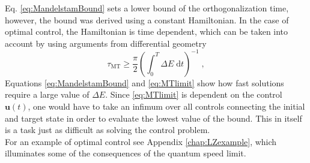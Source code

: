 Eq. \eqref{eq:MandelstamBound} sets a lower bound of the orthogonalization time, however, the bound was derived using a constant Hamiltonian. In the case of optimal control, the Hamiltonian is time dependent, which can be taken into account by using arguments from differential geometry \cite{Aharonov,beyondQSL}
\begin{equation}
	\tau_{\mathrm{MT}} \geq \frac{\pi}{2} \left( \int_{0}^{T} \Delta E \; \mathrm{d}t \right) ^{-1} \; , \label{eq:MTlimit}
\end{equation}
Equations \eqref{eq:MandelstamBound} and \eqref{eq:MTlimit} show how fast solutions require a large value of $\Delta E$. Since \ref{eq:MTlimit} is dependent on the control $\boldsymbol{u}(t)$, one would have to take an infimum over all controls connecting the initial and target state in order to evaluate the lowest value of the bound. This in itself is a task just as difficult as solving the control problem.\\
For an example of optimal control see Appendix \ref{chap:LZexample}, which illuminates some of the consequences of the quantum speed limit.